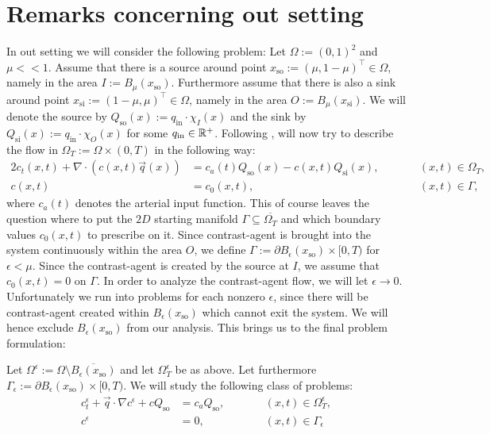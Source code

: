 \documentclass[paper=a4, fontsize=12pt,parskip=half,draft,headings=small]{scrartcl}
\newcommand{\qi}{q_{\mathrm{in}}}
\newcommand{\Qso}{Q_{\mathrm{so}}}
\newcommand{\Qsi}{Q_{\mathrm{si}}}
\newcommand{\q}{\vec{q}}
\newcommand{\xso}{x_\mathrm{so}}
\newcommand{\xsi}{x_\mathrm{si}}
\newcommand{\ce}{c^\epsilon}
\begin{document}
		
		\section{Remarks concerning out setting}
		
		\begin{remark}\label{rem:Equation}
			In out setting we will consider the following problem:
			Let $\Omega:=(0,1)^2$ and $\mu <<1$.
			Assume that there is a source around point $\xso:=(\mu,1-\mu)^\top \in \Omega$, namely in the area $I:=B_{\mu}(\xso)$.
			Furthermore assume that there is also a sink around point $\xsi:=(1-\mu,\mu)^\top \in \Omega$, namely in the area $O:=B_{\mu}(\xsi)$.
			We will denote the source by $\Qso(x):=\qi\cdot\chi_I(x)$ and the sink by $\Qsi(x):=\qi\cdot\chi_O(x)$ for some $\qi \in \R^+$.
			Following \cite{BergenMIC15}, will now try to describe the flow in $\Omega_T:=\Omega \times (0,T)$ in the following way:
			\begin{alignat*}{2}
				c_t(x,t) + \nabla \cdot \left(c(x,t)\q(x) \right) &= c_a(t)\Qso(x) - c(x,t)\Qsi(x), &\qquad  &(x,t) \in \Omega_T, \\
				c(x,t) &= c_0(x,t), && (x,t) \in \Gamma,
			\end{alignat*}
			where $c_a(t)$ denotes the arterial input function.
			This of course leaves the question where to put the $2D$ starting manifold $\Gamma \subseteq \overline{\Omega_T}$ and which boundary values $c_0(x,t)$ to prescribe on it.
			Since contrast-agent is brought into the system continuously within the area $O$, we define $\Gamma:= \partial B_\epsilon(\xso) \times [0,T)$ for $\epsilon < \mu$.
			Since the contrast-agent is created by the source at $I$, we assume that $c_0(x,t) = 0$ on $\Gamma$.
			In order to analyze the contrast-agent flow, we will let $\epsilon \to 0$.
			Unfortunately we run into problems for each nonzero $\epsilon$, since there will be contrast-agent created within $B_\epsilon(\xso)$ which cannot exit the system.
			We will hence exclude $B_\epsilon(\xso)$ from our analysis. This brings us to the final problem formulation:

			Let $\Omega^\epsilon:=\Omega \setminus \overline{B_\epsilon(\xso)}$ and let $\Omega^\epsilon_T$ be as above.
			Let furthermore $\Gamma_\epsilon:= \partial B_\epsilon(\xso) \times [0,T)$.
			We will study the following class of problems:
			\begin{subequations}
				\label{eq:ourProblem}
				\begin{alignat}{2}
					\ce_t + \q \cdot \nabla \ce + c\Qso &= c_a\Qso, &\qquad  &(x,t) \in \Omega_T^\epsilon, \label{eq:ourProblema} \\
					\ce &= 0, && (x,t) \in \Gamma_\epsilon \label{eq:ourProblemb}
				\end{alignat}
			\end{subequations}
			

\end{remark}
\end{document}
